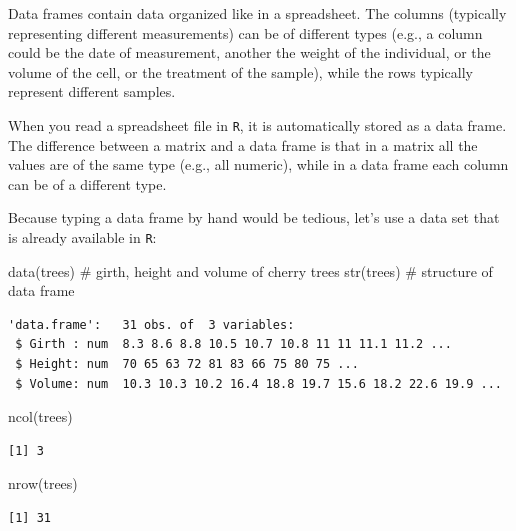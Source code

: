\documentclass[
  letterpaper,
  DIV=11,
  numbers=noendperiod]{scrreprt}
\newenvironment{Shaded}{\begin{snugshade}}{\end{snugshade}}
\newcommand{\CommentTok}[1]{\textcolor[rgb]{0.37,0.37,0.37}{#1}}
\newcommand{\FunctionTok}[1]{\textcolor[rgb]{0.28,0.35,0.67}{#1}}
\newcommand{\NormalTok}[1]{\textcolor[rgb]{0.00,0.23,0.31}{#1}}
\begin{document}
Data frames contain data organized like in a spreadsheet. The columns
(typically representing different measurements) can be of different
types (e.g., a column could be the date of measurement, another the
weight of the individual, or the volume of the cell, or the treatment of
the sample), while the rows typically represent different samples.

When you read a spreadsheet file in \texttt{R}, it is automatically
stored as a data frame. The difference between a matrix and a data frame
is that in a matrix all the values are of the same type (e.g., all
numeric), while in a data frame each column can be of a different type.

Because typing a data frame by hand would be tedious, let's use a data
set that is already available in \texttt{R}:

\begin{Shaded}
\begin{Highlighting}[]
\FunctionTok{data}\NormalTok{(trees) }\CommentTok{\# girth, height and volume of cherry trees}
\FunctionTok{str}\NormalTok{(trees) }\CommentTok{\# structure of data frame}
\end{Highlighting}
\end{Shaded}

\begin{verbatim}
'data.frame':   31 obs. of  3 variables:
 $ Girth : num  8.3 8.6 8.8 10.5 10.7 10.8 11 11 11.1 11.2 ...
 $ Height: num  70 65 63 72 81 83 66 75 80 75 ...
 $ Volume: num  10.3 10.3 10.2 16.4 18.8 19.7 15.6 18.2 22.6 19.9 ...
\end{verbatim}

\begin{Shaded}
\begin{Highlighting}[]
\FunctionTok{ncol}\NormalTok{(trees)}
\end{Highlighting}
\end{Shaded}

\begin{verbatim}
[1] 3
\end{verbatim}

\begin{Shaded}
\begin{Highlighting}[]
\FunctionTok{nrow}\NormalTok{(trees)}
\end{Highlighting}
\end{Shaded}

\begin{verbatim}
[1] 31
\end{verbatim}
\end{document}
